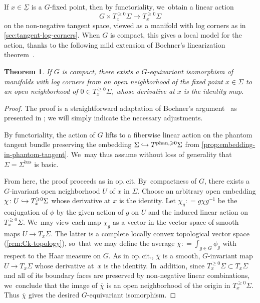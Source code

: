 \documentclass[JEP,XML,SOM,Unicode,NoFloatCountersInSection,published]{cedram}
\newcommand\hto{\mathrel{\lhook\joinrel\to}}
\newtheorem{theorem}{Theorem}[section]
\theoremstyle{definition}
\theoremstyle{remark}
\renewcommand{\ge}{\geqslant}
\newcommand{\defas}{\mathrel{\mathop:}=}
\newcommand{\Sig}{\Sigma}
\newcommand{\uSig}{\underline{\Sigma}}
\newcommand{\bas}[1]{{#1}^{\mathrm{bas}}}
\newcommand{\phant}{\mathrm{phan}}
\newcommand{\Sigbas}{\bas{\Sig}}
\newcommand{\tb}[2][]{T_{#1}#2}
\newcommand{\tbge}[2][]{T^{\ge0}_{#1}#2}
\newcommand{\tbgephan}[2][]{T^{\phant,\ge0}_{#1}#2}
\begin{document}
If $x \in \uSig$ is a $G$\nobreakdash-fixed point, then by functoriality, we~obtain a linear action
\[
G \times \tbge[x]{\Sig} \to \tbge[x]{\Sig}
\]
on the non-negative tangent space, viewed as a manifold with log corners as in \autoref{sec:tangent-log-corners}. When $G$ is compact, this gives a local model for the action, thanks to the following mild extension of Bochner's linearization theorem~\cite{Bochner1945}.
\begin{theorem}
If $G$ is compact, there exists a $G$\nobreakdash-equivariant isomorphism of manifolds with log corners from an open neighborhood of the fixed point $x \in \Sig$ to an open neighborhood of $0 \in \tbge[x]{\Sig}$, whose derivative at $x$ is the identity map.
\end{theorem}
\begin{proof}
The proof is a straightforward adaptation of Bochner's argument~\cite{Bochner1945} as presented in \cite[\S 2.2]{DuistermaatKolk}; we will simply indicate the necessary adjustments.

By functoriality, the action of $G$ lifts to a fiberwise linear action on the phantom tangent bundle preserving the embedding $\Sig\hto \tbgephan{\Sig}$ from \autoref{prop:embedding-in-phantom-tangent}. We~may thus assume without loss of generality that $\Sig = \Sigbas$ is basic.

From here, the proof proceeds as in {op.\,cit.} By~compactness of $G$, there exists a $G$\nobreakdash-invariant open neighborhood $U$ of $x$ in $\Sig$.
Choose an arbitrary open embedding $\chi\colon U \hto \tbge[x]{\Sig}$ whose derivative at $x$ is the identity. Let $\chi_g \defas g \chi g^{-1}$ be the conjugation of $\phi$ by the given action of $g$ on $U$ and the induced linear action on $\tbge[x]{\Sig}$. We~may view each map $\chi_g$ as a vector in the vector space of smooth maps $U \to \tb[x]{\Sig}$.
The latter is a complete locally convex topological vector space (\cf \autoref{rem:Ck-topology}), so~that we may define the average $\overline{\chi} \defas \int_{g \in G} \phi_g$ with respect to the Haar measure on $G$. As in {op.\,cit.}, $\overline{\chi}$ is a smooth, $G$\nobreakdash-invariant map $U \to \tb[x]{\Sig}$ whose derivative at~$x$ is the identity. In~addition, since $\tbge[x]{\Sig}\subset\tb[x]{\Sig}$ and all of its boundary faces are preserved by non-negative linear combinations, we~conclude that the image of $\overline{\chi}$ is an open neighborhood of the origin in $\tbge[x]{\Sig}$. Thus $\overline{\chi}$ gives the desired $G$\nobreakdash-equivariant isomorphism.
\end{proof}
\end{document}
